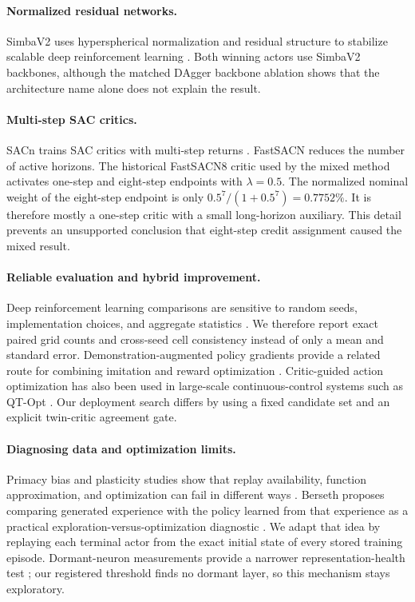 \documentclass[10pt,twocolumn]{article}
\begin{document}
\paragraph{Normalized residual networks.}
SimbaV2 uses hyperspherical normalization and residual structure to stabilize scalable deep reinforcement learning \cite{lee2025simba}. Both winning actors use SimbaV2 backbones, although the matched DAgger backbone ablation shows that the architecture name alone does not explain the result.

\paragraph{Multi-step SAC critics.}
SACn trains SAC critics with multi-step returns \cite{lyskawa2025sacn}. FastSACN reduces the number of active horizons. The historical FastSACN8 critic used by the mixed method activates one-step and eight-step endpoints with $\lambda=0.5$. The normalized nominal weight of the eight-step endpoint is only $0.5^7/(1+0.5^7)=0.7752\%$. It is therefore mostly a one-step critic with a small long-horizon auxiliary. This detail prevents an unsupported conclusion that eight-step credit assignment caused the mixed result.

\paragraph{Reliable evaluation and hybrid improvement.}
Deep reinforcement learning comparisons are sensitive to random seeds, implementation choices, and aggregate statistics \cite{henderson2018matters,agarwal2021precipice}. We therefore report exact paired grid counts and cross-seed cell consistency instead of only a mean and standard error. Demonstration-augmented policy gradients provide a related route for combining imitation and reward optimization \cite{rajeswaran2018dapg}. Critic-guided action optimization has also been used in large-scale continuous-control systems such as QT-Opt \cite{kalashnikov2018qtopt}. Our deployment search differs by using a fixed candidate set and an explicit twin-critic agreement gate.

\paragraph{Diagnosing data and optimization limits.}
Primacy bias and plasticity studies show that replay availability, function approximation, and optimization can fail in different ways \cite{nikishin2022primacy,nauman2024plasticity}. Berseth proposes comparing generated experience with the policy learned from that experience as a practical exploration-versus-optimization diagnostic \cite{berseth2025exploration}. We adapt that idea by replaying each terminal actor from the exact initial state of every stored training episode. Dormant-neuron measurements provide a narrower representation-health test \cite{sokar2023redo}; our registered threshold finds no dormant layer, so this mechanism stays exploratory.
\end{document}
